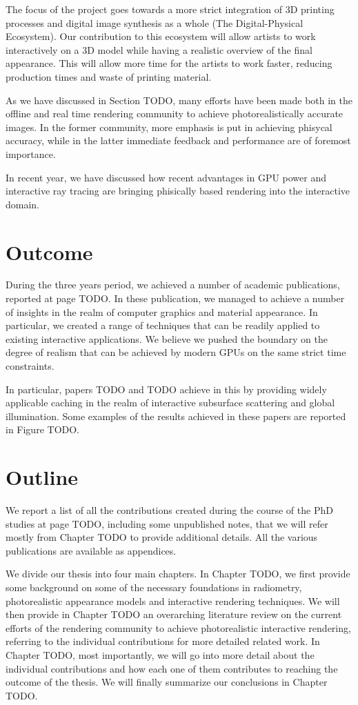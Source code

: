 The focus of the project goes towards a more strict integration of 3D printing processes and
digital image synthesis as a whole (The Digital-Physical Ecosystem). Our contribution to this
ecosystem will allow artists to work interactively on a 3D model while having a realistic overview
of the final appearance. This will allow more time for the artists to work faster, reducing
production times and waste of printing material.


As we have discussed in Section TODO, many efforts have been made both in the offline and real time rendering community to achieve photorealistically accurate images. In the former community, more emphasis is put in achieving phisycal accuracy, while in the latter immediate feedback and performance are of foremost importance.

In recent year, we have discussed how recent advantages in GPU power and interactive ray tracing are bringing phisically based rendering into the interactive domain. 

\section{Outcome}

During the three years period, we achieved a number of academic publications, reported at page TODO. In these publication, we managed to achieve a number of insights in the realm of computer graphics and material appearance. In particular, we created a range of techniques that can be readily applied to existing interactive applications. We believe we pushed the boundary on the degree of realism that can be achieved by modern GPUs on the same strict time constraints. 

In particular, papers TODO and TODO achieve in this by providing widely applicable caching in the realm of interactive subsurface scattering and global illumination. Some examples of the results achieved in these papers are reported in Figure TODO.

\section{Outline}

We report a list of all the contributions created during the course of the PhD studies at page TODO, including some unpublished notes, that we will refer mostly from Chapter TODO to provide additional details. All the various publications are available as appendices. 

We divide our thesis into four main chapters. In Chapter TODO, we first provide some background on some of the necessary foundations in radiometry, photorealistic appearance models and interactive rendering techniques. We will then provide in Chapter TODO an overarching literature review on the current efforts of the rendering community to achieve photorealistic interactive rendering, referring to the individual contributions for more detailed related work. In Chapter TODO, most importantly, we will go into more detail about the individual contributions and how each one of them contributes to reaching the outcome of the thesis. We will finally summarize our conclusions in Chapter TODO. 
